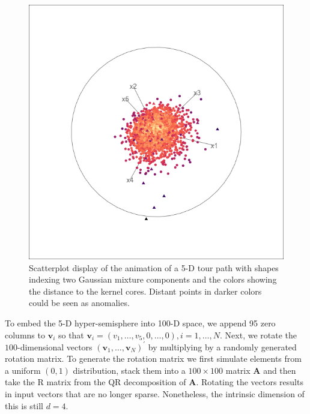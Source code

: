 \documentclass[
]{article}
\begin{document}
\begin{figure}

{\centering \includegraphics[width=0.7\linewidth]{figures/tourr_5d_semisphere} 

}

\caption{Scatterplot display of the animation of a 5-D tour path with shapes indexing two Gaussian mixture components and the colors showing the distance to the kernel cores. Distant points in darker colors could be seen as anomalies.}\label{fig:fivedmeta}
\end{figure}

To embed the 5-D hyper-semisphere into 100-D space, we append 95 zero
columns to \(\bm{v}_i\) so that
\(\bm{v}_i=(v_1, \dots, v_5, 0, \dots, 0), i=1,\dots,N\). Next, we
rotate the \(100\)-dimensional vectors
\((\bm{v}_1, \dots, \bm{v}_N)^\prime\) by multiplying by a randomly
generated rotation matrix. To generate the rotation matrix we first
simulate elements from a uniform \((0,1)\) distribution, stack them into
a \(100\times 100\) matrix \(\bm{A}\) and then take the R matrix from
the QR decomposition of \(\bm{A}\). Rotating the vectors results in
input vectors that are no longer sparse. Nonetheless, the intrinsic
dimension of this is still \(d=4\).
\end{document}
